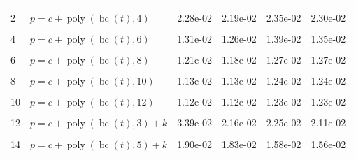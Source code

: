 \documentclass[12pt,a4paper]{article}
\DeclareMathOperator{\bc}{bc}
\DeclareMathOperator{\poly}{poly}
\begin{document}
\begin{longtable}[t]{ll>{\raggedleft\arraybackslash}p{2cm}>{\raggedleft\arraybackslash}p{2cm}>{\raggedleft\arraybackslash}p{2cm}>{\raggedleft\arraybackslash}p{2cm}}
\endfoot
\bottomrule
\endlastfoot
\cellcolor{gray!6}{1} & \cellcolor{gray!6}{$p = c + \poly\left( \bc(t), 3 \right)$} & \cellcolor{gray!6}{3.46e-02} & \cellcolor{gray!6}{2.29e-02} & \cellcolor{gray!6}{2.44e-02} & \cellcolor{gray!6}{2.32e-02}\\
2 & $p = c + \poly\left( \bc(t), 4 \right)$ & 2.28e-02 & 2.19e-02 & 2.35e-02 & 2.30e-02\\
\cellcolor{gray!6}{3} & \cellcolor{gray!6}{$p = c + \poly\left( \bc(t), 5 \right)$} & \cellcolor{gray!6}{2.03e-02} & \cellcolor{gray!6}{1.98e-02} & \cellcolor{gray!6}{1.85e-02} & \cellcolor{gray!6}{1.83e-02}\\
4 & $p = c + \poly\left( \bc(t), 6 \right)$ & 1.31e-02 & 1.26e-02 & 1.39e-02 & 1.35e-02\\
\cellcolor{gray!6}{5} & \cellcolor{gray!6}{$p = c + \poly\left( \bc(t), 7 \right)$} & \cellcolor{gray!6}{1.31e-02} & \cellcolor{gray!6}{1.25e-02} & \cellcolor{gray!6}{1.37e-02} & \cellcolor{gray!6}{1.34e-02}\\
6 & $p = c + \poly\left( \bc(t), 8 \right)$ & 1.21e-02 & 1.18e-02 & 1.27e-02 & 1.27e-02\\
\cellcolor{gray!6}{7} & \cellcolor{gray!6}{$p = c + \poly\left( \bc(t), 9 \right)$} & \cellcolor{gray!6}{1.15e-02} & \cellcolor{gray!6}{1.15e-02} & \cellcolor{gray!6}{1.26e-02} & \cellcolor{gray!6}{1.25e-02}\\
8 & $p = c + \poly\left( \bc(t), 10 \right)$ & 1.13e-02 & 1.13e-02 & 1.24e-02 & 1.24e-02\\
\cellcolor{gray!6}{9} & \cellcolor{gray!6}{$p = c + \poly\left( \bc(t), 11 \right)$} & \cellcolor{gray!6}{1.12e-02} & \cellcolor{gray!6}{1.12e-02} & \cellcolor{gray!6}{1.23e-02} & \cellcolor{gray!6}{1.23e-02}\\
10 & $p = c + \poly\left( \bc(t), 12 \right)$ & 1.12e-02 & 1.12e-02 & 1.23e-02 & 1.23e-02\\
\cellcolor{gray!6}{11} & \cellcolor{gray!6}{$p = c + \poly\left( \bc(t), 13 \right)$} & \cellcolor{gray!6}{1.12e-02} & \cellcolor{gray!6}{1.12e-02} & \cellcolor{gray!6}{1.23e-02} & \cellcolor{gray!6}{1.23e-02}\\
12 & $p = c + \poly\left( \bc(t), 3 \right) + k$ & 3.39e-02 & 2.16e-02 & 2.25e-02 & 2.11e-02\\
\cellcolor{gray!6}{13} & \cellcolor{gray!6}{$p = c + \poly\left( \bc(t), 4 \right) + k$} & \cellcolor{gray!6}{2.16e-02} & \cellcolor{gray!6}{2.06e-02} & \cellcolor{gray!6}{2.15e-02} & \cellcolor{gray!6}{2.08e-02}\\
14 & $p = c + \poly\left( \bc(t), 5 \right) + k$ & 1.90e-02 & 1.83e-02 & 1.58e-02 & 1.56e-02\\

\end{longtable}
\end{document}
